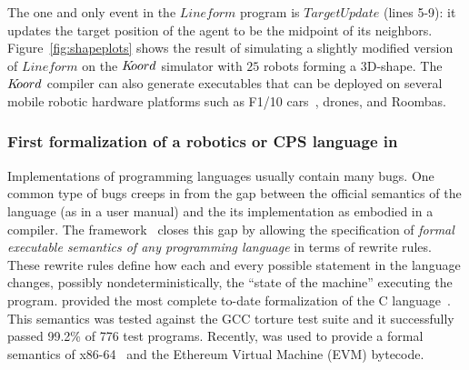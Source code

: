 %
The one and only event in the $\mathit{Lineform}$ program is $\mathit{TargetUpdate}$ (lines 5-9): it updates the target position of the agent  to be the midpoint of its neighbors.  Figure~\ref{fig:shapeplots} shows the result of simulating a slightly modified version of $\mathit{Lineform}$ on the $K\kern-2pt oord$ simulator with $25$ robots forming a 3D-shape. The $K\kern-2pt oord$ compiler can also generate executables that can be deployed on several mobile robotic hardware platforms such as F1/10 cars~\cite{f110}, drones, and Roombas. 
 

%


\subsubsection{First formalization of a robotics or CPS language in \K}
Implementations of programming languages usually contain many bugs. One common type of bugs creeps in from the gap between the official semantics of the language (as in a user manual) and the its implementation as embodied in a compiler. The \K framework~\cite{rosu-serbanuta-2013-k} closes this gap by allowing the specification of {\em  formal executable semantics of any programming language} in terms of rewrite rules. These rewrite rules define how each and every possible statement in the  language changes, possibly nondeterministically, the ``state of the machine'' executing the program. 
%
\K  provided the most complete to-date formalization  of the C language~\cite{KC}. This semantics was tested against the GCC torture test suite and it successfully passed 99.2\% of 776 test programs. Recently, \K  was used to provide a formal semantics of x86-64~\cite{rosuadvepaper} and the Ethereum Virtual Machine (EVM) bytecode. 


